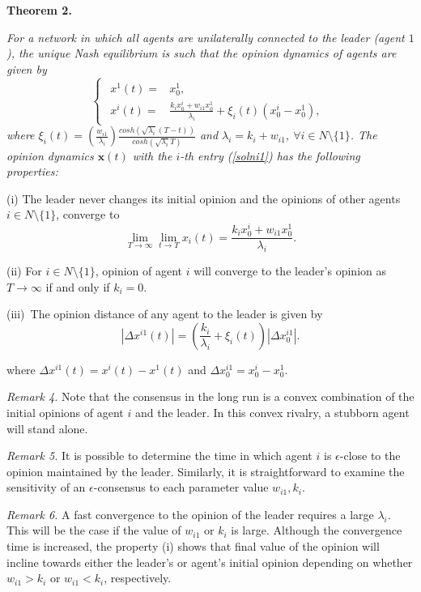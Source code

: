 \documentclass[10pt, conference, compsocconf]{IEEEtran}
\begin{document}
{\bf Theorem 2.} {\it For a network in which all agents are unilaterally connected to the leader (agent $1$), the unique Nash equilibrium is such that the opinion dynamics of agents are given by 
\begin{equation} \label{solni2}
	\begin{cases}	
		\!\begin{aligned}		
		x^1(t) = & x_0^1, \\
		x^i(t) = & \frac{k_i x_0^i + w_{i1} x_0^1}{\lambda_i} + \xi_i(t) \left( x_0^i - x_0^1 \right),
		\end{aligned}
	\end{cases}
\end{equation}
where $\xi_i(t) = \left( \frac{w_{i1}}{\lambda_i} \right)  \frac{cosh\left(\sqrt{\lambda_i}(T-t)\right)}{cosh(\sqrt{\lambda_i}T)}$ and $\lambda_i = k_i+w_{i1}$, $\forall i \in N\setminus \lbrace 1\rbrace$. The opinion dynamics $\mathbf{x}(t)$ with the $i$-th entry (\ref{solni1}) has the following properties:

(i) The leader never changes its initial opinion and the opinions of other agents $i \in N \setminus \lbrace 1 \rbrace$, converge to
\begin{equation}
\lim_{T\rightarrow \infty}\lim_{t\rightarrow T}  x_i(t) =  \frac{k_i x_0^i + w_{i1} x_0^1}{\lambda_i}.
\end{equation}

(ii) For  $i \in N \setminus \lbrace 1 \rbrace$, opinion of agent $i$ will converge to the leader's opinion as $T\rightarrow\infty$ if and only if $k_i = 0$. 

(iii)\ The opinion distance of any agent to the leader is given by
\begin{equation}
	|\Delta x^{i1}(t)| = \left( \frac{k_i}{\lambda_i} + \xi_i(t) \right) |\Delta	x_0^{i1}|.
\end{equation} }
where $\Delta x^{i1}(t) = x^i(t)-x^1(t)$ and $\Delta x_0^{i1}=x_0^i - x_0^1$.

{\it Remark 4.} Note that the consensus in the long run is a convex combination of the initial opinions of agent $i$ and the leader. In this convex rivalry, a stubborn agent will stand alone.

{\it Remark 5.} It is possible to determine the time in which agent $i$ is $\epsilon$-close to the opinion maintained by the leader. Similarly, it is straightforward to examine the sensitivity of an $\epsilon$-consensus to each parameter value $w_{i1}, k_{i}$.

{\it Remark 6.} A fast convergence to the opinion of the leader requires a large $\lambda_i$. This will be the case if the value of $w_{i1}$ or $k_i$ is large. Although the convergence time is increased, the property (i) shows that final value of the opinion will incline towards either the leader's or agent's initial opinion depending on whether $w_{i1}>k_i$ or $w_{i1}<k_i$, respectively.
\end{document}
